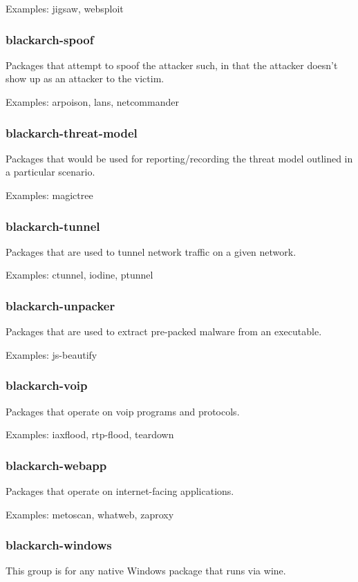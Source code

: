\documentclass[a4paper, oneside, 11pt]{book}
\begin{document}
Examples: jigsaw, websploit

\subsubsection{blackarch-spoof}
Packages that attempt to spoof the attacker such, in that
the attacker doesn't show up as an attacker to the victim.

Examples: arpoison, lans, netcommander

\subsubsection{blackarch-threat-model}
Packages that would be used for reporting/recording the
threat model outlined in a particular scenario.

Examples: magictree

\subsubsection{blackarch-tunnel}
Packages that are used to tunnel network traffic on a given
network.

Examples: ctunnel, iodine, ptunnel

\subsubsection{blackarch-unpacker}
Packages that are used to extract pre-packed malware from an
executable.

Examples: js-beautify

\subsubsection{blackarch-voip}
Packages that operate on voip programs and protocols.

Examples: iaxflood, rtp-flood, teardown

\subsubsection{blackarch-webapp}
Packages that operate on internet-facing applications.

Examples: metoscan, whatweb, zaproxy

\subsubsection{blackarch-windows}
This group is for any native Windows package that runs via wine.
\end{document}
